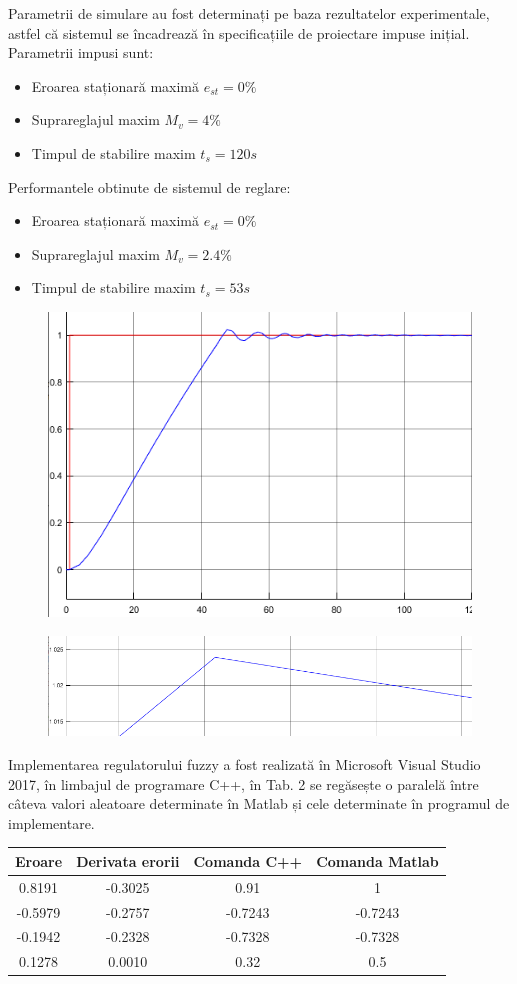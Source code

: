 \documentclass[11pt]{article}
\begin{document}
Parametrii de simulare au fost determinați pe baza rezultatelor experimentale, astfel că sistemul se încadrează în specificațiile de proiectare impuse inițial.
Parametrii impusi sunt:
\begin{itemize}
	\item Eroarea staționară maximă $e_{st} = 0\%$
	\item Suprareglajul maxim $M_v = 4\%$
	\item Timpul de stabilire maxim $t_s = 120s$
\end{itemize}
Performantele obtinute de sistemul de reglare:
\begin{itemize}
	\item Eroarea staționară maximă $e_{st} = 0\%$
	\item Suprareglajul maxim $M_v = 2.4\%$
	\item Timpul de stabilire maxim $t_s = 53s$
\end{itemize}
\begin{figure}[H]
	\centering
	\includegraphics[width=0.6\linewidth]{diagrama.PNG}
	\label{fig:test2}
\end{figure}
\begin{figure}[H]
	\centering
	\includegraphics[width=0.9\linewidth]{evidentiere_supra.PNG}
	\label{fig:test2}
\end{figure}
Implementarea regulatorului fuzzy a fost realizată în Microsoft Visual Studio 2017, în limbajul de programare C++, în Tab. 2 se regăsește o paralelă între câteva valori aleatoare determinate în Matlab și cele determinate în programul de implementare.
\begin{center}
	\begin{tabular}{|c|c|c|c|}
		\hline
		Eroare&Derivata erorii&Comanda C++&Comanda Matlab\\
		\hline
		0.8191&-0.3025&0.91&1\\
		-0.5979&-0.2757&-0.7243&-0.7243\\
		-0.1942&-0.2328&-0.7328&-0.7328\\
		0.1278&0.0010&0.32&0.5\\
		\hline
	\end{tabular}
\end{center}
\newpage

\nocite{*}


\end{document}
